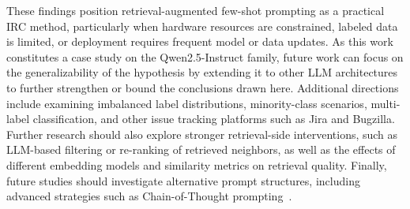 These findings position retrieval-augmented few-shot prompting as a practical IRC method, particularly when hardware resources are constrained, labeled data is limited, or deployment requires frequent model or data updates. As this work constitutes a case study on the Qwen2.5-Instruct family, future work can focus on the generalizability of the hypothesis by extending it to other LLM architectures to further strengthen or bound the conclusions drawn here. Additional directions include examining imbalanced label distributions, minority-class scenarios, multi-label classification, and other issue tracking platforms such as Jira and Bugzilla. Further research should also explore stronger retrieval-side interventions, such as LLM-based filtering or re-ranking of retrieved neighbors, as well as the effects of different embedding models and similarity metrics on retrieval quality. Finally, future studies should investigate alternative prompt structures, including advanced strategies such as Chain-of-Thought prompting~\cite{koyuncu2025exploring}.
